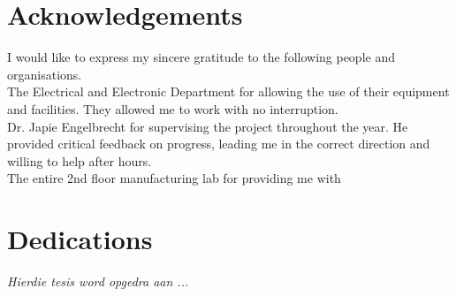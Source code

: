 \begin{abstract}[english]%
meep
\end{abstract}


\begin{abstract}[afrikaans]%
meep
\end{abstract}


\chapter{Acknowledgements}%

I would like to express my sincere gratitude to the following people
and organisations.\\

The Electrical and Electronic Department for allowing the use of their equipment and facilities. They allowed me to work with no interruption.\\

Dr. Japie Engelbrecht for supervising the project throughout the year. He provided critical feedback on progress, leading me in the correct direction and willing to help after hours.\\

The entire 2nd floor manufacturing lab for providing me with  


\chapter{Dedications}%
 \vfill
 \begin{Afr}
 \begin{center}\itshape
    Hierdie tesis word opgedra aan ...
 \end{center}
 \end{Afr}
 \vfill
 \clearpage

\endinput

